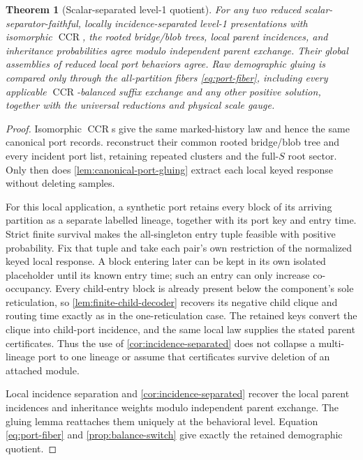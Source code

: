 \documentclass[11pt]{article}
\newtheorem{theorem}{Theorem}[section]
\newcommand{\CCR}{\operatorname{CCR}}
\begin{document}
\begin{theorem}[Scalar-separated level-1 quotient]
\label{thm:level1}
For any two reduced scalar-separator-faithful, locally incidence-separated level-1 presentations with isomorphic $\CCR$, the rooted bridge/blob trees, local parent incidences, and inheritance probabilities agree modulo independent parent exchange.  Their global assemblies of reduced local port behaviors agree.  Raw demographic gluing is compared only through the all-partition fibers \eqref{eq:port-fiber}, including every applicable $\CCR$-balanced suffix exchange and any other positive solution, together with the universal reductions and physical scale gauge.
\end{theorem}

\begin{proof}
Isomorphic $\CCR$s give the same marked-history law and hence the same canonical port records.   reconstruct their common rooted bridge/blob tree and every incident port list, retaining repeated clusters and the full-$S$ root sector.  Only then does \cref{lem:canonical-port-gluing} extract each local keyed response without deleting samples.

For this local application, a synthetic port retains every block of its
arriving partition as a separate labelled lineage, together with its port key
and entry time.  Strict finite survival makes the all-singleton entry tuple
feasible with positive probability.  Fix that tuple and take each pair's own
restriction of the normalized keyed local response.  A block entering later
can be kept in its own isolated placeholder until its known entry time; such
an entry can only increase co-occupancy.  Every child-entry block is already
present below the component's sole reticulation, so
\cref{lem:finite-child-decoder} recovers its negative child clique and routing
time exactly as in the one-reticulation case.  The retained keys convert the
clique into child-port incidence, and the same local law supplies the stated
parent certificates.  Thus the use of \cref{cor:incidence-separated} does not
collapse a multi-lineage port to one lineage or assume that certificates
survive deletion of an attached module.

Local incidence separation and \cref{cor:incidence-separated} recover the local parent incidences and inheritance weights modulo independent parent exchange.  The gluing lemma reattaches them uniquely at the behavioral level.  Equation \eqref{eq:port-fiber} and \cref{prop:balance-switch} give exactly the retained demographic quotient.
\end{proof}
\end{document}
